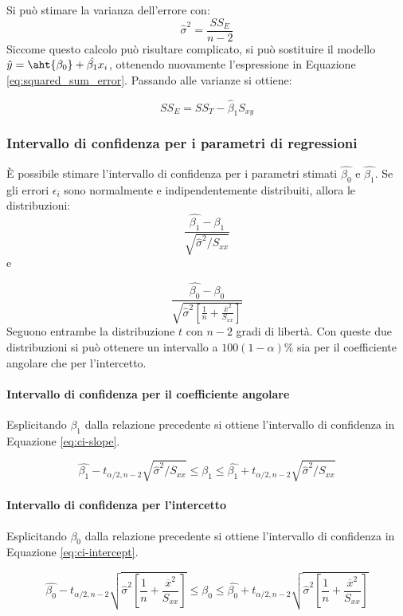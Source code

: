 \documentclass{article}
\begin{document}
Si può stimare la varianza dell'errore con:
\[
  \hat{\sigma}^2 = \frac{SS_E}{n-2}
\]
Siccome questo calcolo può risultare complicato, si può sostituire il modello 
$\hat{y} = \aht{\beta_0} + \hat{\beta_1}x_i$, ottenendo nuovamente l'espressione in Equazione
\ref{eq:squared_sum_error}. Passando alle varianze si ottiene:

\[
  SS_E = SS_T - \hat{\beta}_1 S_{xy}
\]

\subsubsection{Intervallo di confidenza per i parametri di regressioni}
È possibile stimare l'intervallo di confidenza per i parametri stimati $\hat{\beta_0}$ e 
$\hat{\beta_1}$. Se gli errori $\epsilon_i$ sono normalmente e indipendentemente distribuiti,
allora le distribuzioni:
\[
  \frac{\hat{\beta_1} - \beta_1}{\sqrt{\hat{\sigma}^2/S_{xx}}}
\]
e 

\[
  \frac{\hat{\beta_0} - \beta_0}
  {\sqrt{\hat{\sigma}^2[\frac{1}{n}+\frac{\overline{x}^2}{S_{xx}}]}}
\]
Seguono entrambe la distribuzione $t$ con $n-2$ gradi di libertà. Con queste due 
distribuzioni si può ottenere un intervallo a $100(1-\alpha)\%$ sia per il coefficiente 
angolare che per l'intercetto.

\paragraph{Intervallo di confidenza per il coefficiente angolare}Esplicitando $\beta_1$ 
dalla relazione precedente si ottiene l'intervallo di confidenza in Equazione
\ref{eq:ci-slope}.

\begin{equation}
  \hat{\beta_1}  - t_{\alpha/2,n-2} \sqrt{\hat{\sigma}^2/S_{xx}} \leq \beta_1 \leq 
  \hat{\beta_1}  + t_{\alpha/2,n-2} \sqrt{\hat{\sigma}^2/S_{xx}}
  \label{eq:ci-slope}
\end{equation}

\paragraph{Intervallo di confidenza per l'intercetto}Esplicitando $\beta_0$ 
dalla relazione precedente si ottiene l'intervallo di confidenza in Equazione
\ref{eq:ci-intercept}.

\begin{equation}
  \hat{\beta_0}  - t_{\alpha/2,n-2} \sqrt{\hat{\sigma}^2\left[\frac{1}{n}+
  \frac{\overline{x}^2}{S_{xx}}\right]} 
  \leq \beta_0 \leq 
  \hat{\beta_0}  + t_{\alpha/2,n-2} \sqrt{\hat{\sigma}^2\left[\frac{1}{n}+
  \frac{\overline{x}^2}{S_{xx}}\right]} 
  \label{eq:ci-intercept}
\end{equation}
\end{document}
